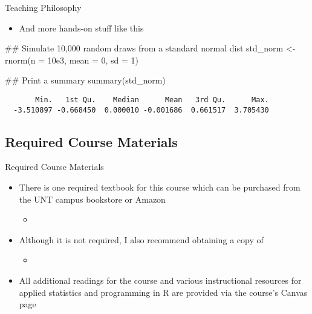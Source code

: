 \documentclass[12pt,ignorenonframetext,aspectratio=169]{beamer}
\providecommand{\tightlist}{%
	\setlength{\itemsep}{0.25em}\setlength{\parskip}{0pt}}
\newenvironment{Shaded}{\linespread{1}}{}
\newcommand{\AttributeTok}[1]{#1}
\newcommand{\DecValTok}[1]{#1}
\newcommand{\DocumentationTok}[1]{\textcolor[rgb]{0.00,0.50,0.00}{#1}}
\newcommand{\FloatTok}[1]{#1}
\newcommand{\FunctionTok}[1]{#1}
\newcommand{\NormalTok}[1]{#1}
\newcommand{\OtherTok}[1]{\textcolor[rgb]{1.00,0.25,0.00}{#1}}
\begin{document}
\begin{frame}[fragile]{Teaching Philosophy}
\protect\hypertarget{teaching-philosophy-1}{}
\begin{itemize}[<+->]
\tightlist
\item
  And more hands-on stuff like this
\end{itemize}

\begin{Shaded}
\begin{Highlighting}[]
\DocumentationTok{\#\# Simulate 10,000 random draws from a standard normal dist}
\NormalTok{std\_norm }\OtherTok{\textless{}{-}} \FunctionTok{rnorm}\NormalTok{(}\AttributeTok{n =} \FloatTok{10e3}\NormalTok{, }\AttributeTok{mean =} \DecValTok{0}\NormalTok{, }\AttributeTok{sd =} \DecValTok{1}\NormalTok{)}

\DocumentationTok{\#\# Print a summary}
\FunctionTok{summary}\NormalTok{(std\_norm)}
\end{Highlighting}
\end{Shaded}

\begin{verbatim}
       Min.   1st Qu.    Median      Mean   3rd Qu.      Max. 
  -3.510897 -0.668450  0.000010 -0.001686  0.661517  3.705430
\end{verbatim}
\end{frame}

\hypertarget{required-course-materials}{%
\subsection{Required Course Materials}\label{required-course-materials}}

\begin{frame}{Required Course Materials}
\begin{itemize}[<+->]
\item
  There is one required textbook for this course which can be purchased
  from the UNT campus bookstore or Amazon

  \begin{itemize}[<+->]
  \item
  \end{itemize}
\item
  Although it is not required, I also recommend obtaining a copy of

  \begin{itemize}[<+->]
  \item
  \end{itemize}
\item
  All additional readings for the course and various instructional
  resources for applied statistics and programming in R are provided via
  the course's Canvas page
\end{itemize}
\end{frame}
\end{document}
